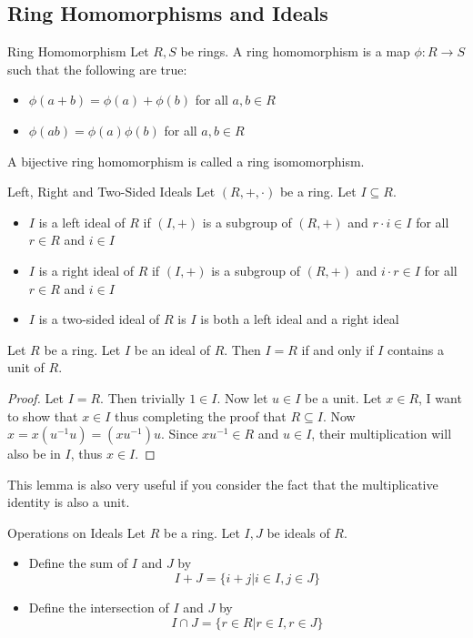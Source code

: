 \documentclass[a4paper]{article}
\begin{document}
\pagebreak
\subsection{Ring Homomorphisms and Ideals}
\begin{defn}{Ring Homomorphism}{} Let $R,S$ be rings. A ring homomorphism is a map $\phi:R\to S$ such that the following are true: 
\begin{itemize}
\item $\phi(a+b)=\phi(a)+\phi(b)$ for all $a,b\in R$
\item $\phi(ab)=\phi(a)\phi(b)$ for all $a,b\in R$
\end{itemize}
A bijective ring homomorphism is called a ring isomomorphism. 
\end{defn}

\begin{defn}{Left, Right and Two-Sided Ideals}{} Let $(R,+,\cdot)$ be a ring. Let $I\subseteq R$. 
\begin{itemize}
\item $I$ is a left ideal of $R$ if $(I,+)$ is a subgroup of $(R,+)$ and $r\cdot i\in I$ for all $r\in R$ and $i\in I$
\item $I$ is a right ideal of $R$ if $(I,+)$ is a subgroup of $(R,+)$ and $i\cdot r\in I$ for all $r\in R$ and $i\in I$
\item $I$ is a two-sided ideal of $R$ is $I$ is both a left ideal and a right ideal
\end{itemize}
\end{defn}

\begin{lmm}{}{} Let $R$ be a ring. Let $I$ be an ideal of $R$. Then $I=R$ if and only if $I$ contains a unit of $R$. \tcbline
\begin{proof}
Let $I=R$. Then trivially $1\in I$. Now let $u\in I$ be a unit. Let $x\in R$, I want to show that $x\in I$ thus completing the proof that $R\subseteq I$. Now $x=x(u^{-1}u)=(xu^{-1})u$. Since $xu^{-1}\in R$ and $u\in I$, their multiplication will also be in $I$, thus $x\in I$. 
\end{proof}
\end{lmm}

This lemma is also very useful if you consider the fact that the multiplicative identity is also a unit. 

\begin{defn}{Operations on Ideals}{} Let $R$ be a ring. Let $I,J$ be ideals of $R$. 
\begin{itemize}
\item Define the sum of $I$ and $J$ by $$I+J=\{i+j|i\in I,j\in J\}$$
\item Define the intersection of $I$ and $J$ by $$I\cap J=\{r\in R|r\in I,r\in J\}$$
\end{itemize}
\end{defn}
\end{document}
